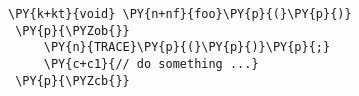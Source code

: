  {\footnotesize
 \begin{Verbatim}[commandchars=\\\{\}]
 \PY{k+kt}{void} \PY{n+nf}{foo}\PY{p}{(}\PY{p}{)}
 \PY{p}{\PYZob{}}
     \PY{n}{TRACE}\PY{p}{(}\PY{p}{)}\PY{p}{;}
     \PY{c+c1}{// do something ...}
 \PY{p}{\PYZcb{}}
 \end{Verbatim}
 }
